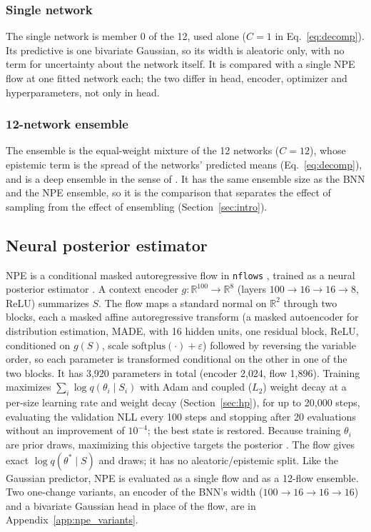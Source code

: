 \documentclass[11pt]{article}
\newcommand{\code}[1]{\texttt{#1}}
\begin{document}
\subsubsection{Single network}
\label{sec:gauss_single}
The single network is member 0 of the 12, used alone ($C=1$ in Eq.~\eqref{eq:decomp}). Its predictive is one bivariate Gaussian, so its width
is aleatoric only, with no term for uncertainty about the network itself. It is compared with a single NPE flow at one
fitted network each; the two differ in head, encoder, optimizer and hyperparameters, not only in head.

\subsubsection{12-network ensemble}
\label{sec:gauss_ens}
The ensemble is the equal-weight mixture of the 12 networks ($C=12$), whose epistemic term is the spread of the networks' predicted
means (Eq.~\eqref{eq:decomp}), and is a deep ensemble in the sense of \citet{lakshminarayanan2017ensembles}. It has the same
ensemble size as the BNN and the NPE ensemble, so it is the comparison that separates the effect of sampling from the
effect of ensembling (Section~\ref{sec:intro}).

\subsection{Neural posterior estimator}
\label{sec:npe}
NPE is a conditional masked autoregressive flow \citep{papamakarios2017maf} in \code{nflows} \citep{durkan2020nflows},
trained as a neural posterior estimator \citep{papamakarios2016fast}. A context encoder
$g:\mathbb{R}^{100}\to\mathbb{R}^{8}$ (layers $100\to16\to16\to8$, ReLU) summarizes $S$. The flow maps a
standard normal on $\mathbb{R}^2$ through two blocks, each a masked affine autoregressive transform (a masked
autoencoder for distribution estimation, MADE, with 16 hidden units, one residual block, ReLU, conditioned on $g(S)$, scale $\mathrm{softplus}(\cdot)+\varepsilon$)
followed by reversing the variable order, so each parameter is transformed conditional on the other in one
of the two blocks. It has 3{,}920 parameters in total (encoder 2{,}024, flow 1{,}896). Training maximizes
$\sum_i\log q(\theta_i\mid S_i)$ with Adam \citep{kingma2015adam} and coupled ($L_2$) weight decay at a per-size
learning rate and weight decay (Section~\ref{sec:hp}), for up to 20{,}000 steps, evaluating the validation NLL every
100 steps and stopping after 20 evaluations without an improvement of $10^{-4}$; the best state is restored. Because
training $\theta_i$ are prior draws, maximizing this objective targets the posterior \citep{papamakarios2016fast}. The
flow gives exact $\log q(\theta^*\mid S)$ and draws; it has no aleatoric/epistemic split. Like the Gaussian predictor,
NPE is evaluated as a single flow and as a 12-flow ensemble. Two one-change variants, an encoder of the BNN's width
($100\to16\to16\to16$) and a bivariate Gaussian head in place of the flow, are in Appendix~\ref{app:npe_variants}.
\end{document}
